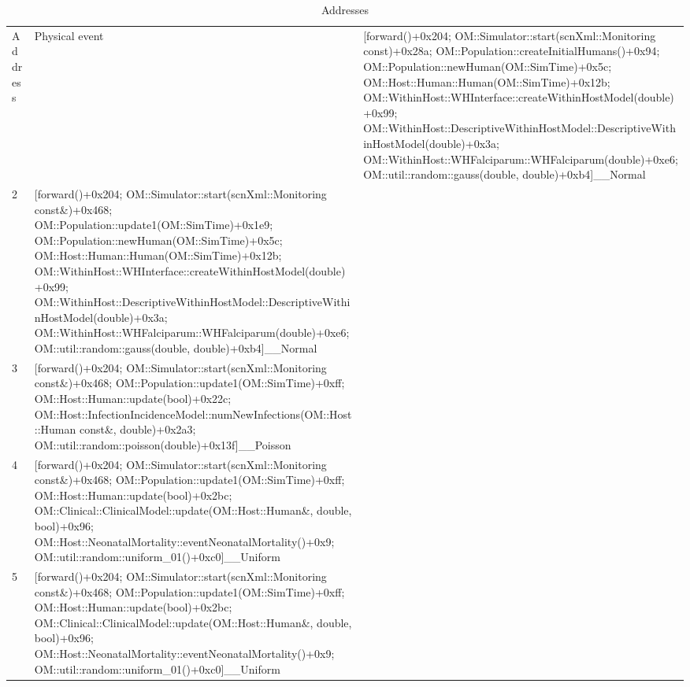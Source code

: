 \documentclass{article}
\begin{document}
\begin{table}[b!]
\footnotesize
\setlength{\tabcolsep}{1mm}
\caption{Addresses}
\label{table:addresses}
\def\arraystretch{1.25}
\begin{tabularx}{\textwidth}{@{}lX@{}} 
\toprule
Address & Physical event                                                                                                                             & [forward()+0x204; OM::Simulator::start(scnXml::Monitoring const)+0x28a; OM::Population::createInitialHumans()+0x94; OM::Population::newHuman(OM::SimTime)+0x5c; OM::Host::Human::Human(OM::SimTime)+0x12b; OM::WithinHost::WHInterface::createWithinHostModel(double)+0x99; OM::WithinHost::DescriptiveWithinHostModel::DescriptiveWithinHostModel(double)+0x3a; OM::WithinHost::WHFalciparum::WHFalciparum(double)+0xe6; OM::util::random::gauss(double, double)+0xb4]\_\_Normal\\
2 & [forward()+0x204; OM::Simulator::start(scnXml::Monitoring const\&)+0x468; OM::Population::update1(OM::SimTime)+0x1e9; OM::Population::newHuman(OM::SimTime)+0x5c; OM::Host::Human::Human(OM::SimTime)+0x12b; OM::WithinHost::WHInterface::createWithinHostModel(double)+0x99; OM::WithinHost::DescriptiveWithinHostModel::DescriptiveWithinHostModel(double)+0x3a; OM::WithinHost::WHFalciparum::WHFalciparum(double)+0xe6; OM::util::random::gauss(double, double)+0xb4]\_\_Normal\\
3 & [forward()+0x204; OM::Simulator::start(scnXml::Monitoring const\&)+0x468; OM::Population::update1(OM::SimTime)+0xff; OM::Host::Human::update(bool)+0x22c; OM::Host::InfectionIncidenceModel::numNewInfections(OM::Host::Human const\&, double)+0x2a3; OM::util::random::poisson(double)+0x13f]\_\_Poisson\\
4 & [forward()+0x204; OM::Simulator::start(scnXml::Monitoring const\&)+0x468; OM::Population::update1(OM::SimTime)+0xff; OM::Host::Human::update(bool)+0x2bc; OM::Clinical::ClinicalModel::update(OM::Host::Human\&, double, bool)+0x96; OM::Host::NeonatalMortality::eventNeonatalMortality()+0x9; OM::util::random::uniform\_01()+0xc0]\_\_Uniform\\
5 & [forward()+0x204; OM::Simulator::start(scnXml::Monitoring const\&)+0x468; OM::Population::update1(OM::SimTime)+0xff; OM::Host::Human::update(bool)+0x2bc; OM::Clinical::ClinicalModel::update(OM::Host::Human\&, double, bool)+0x96; OM::Host::NeonatalMortality::eventNeonatalMortality()+0x9; OM::util::random::uniform\_01()+0xc0]\_\_Uniform\\

\end{tabularx}
\end{table}
\end{document}
